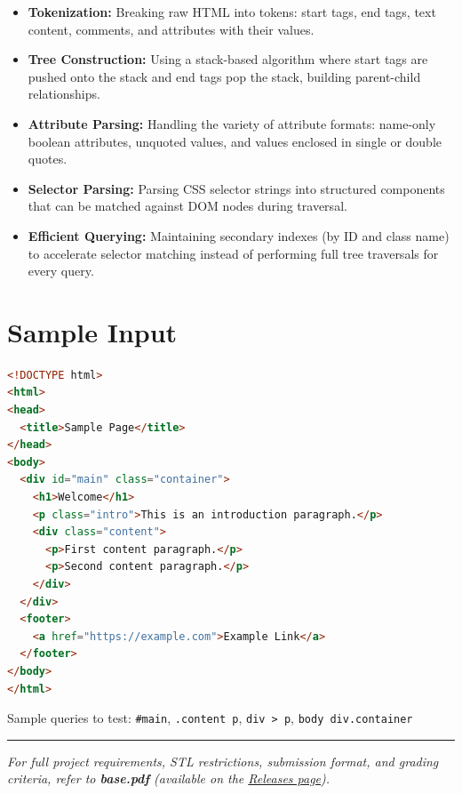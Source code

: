 \begin{itemize}
  \item \textbf{Tokenization:} Breaking raw HTML into tokens: start tags, end tags, text content, comments, and attributes with their values.
  \item \textbf{Tree Construction:} Using a stack-based algorithm where start tags are pushed onto the stack and end tags pop the stack, building parent-child relationships.
  \item \textbf{Attribute Parsing:} Handling the variety of attribute formats: name-only boolean attributes, unquoted values, and values enclosed in single or double quotes.
  \item \textbf{Selector Parsing:} Parsing CSS selector strings into structured components that can be matched against DOM nodes during traversal.
  \item \textbf{Efficient Querying:} Maintaining secondary indexes (by ID and class name) to accelerate selector matching instead of performing full tree traversals for every query.
\end{itemize}

\section{Sample Input}

\begin{lstlisting}[language=HTML, caption={data/input\_sample.html}]
<!DOCTYPE html>
<html>
<head>
  <title>Sample Page</title>
</head>
<body>
  <div id="main" class="container">
    <h1>Welcome</h1>
    <p class="intro">This is an introduction paragraph.</p>
    <div class="content">
      <p>First content paragraph.</p>
      <p>Second content paragraph.</p>
    </div>
  </div>
  <footer>
    <a href="https://example.com">Example Link</a>
  </footer>
</body>
</html>
\end{lstlisting}

Sample queries to test: \texttt{\#main}, \texttt{.content p}, \texttt{div > p}, \texttt{body div.container}

\vfill
\noindent\rule{\textwidth}{0.4pt}
{\small\textit{For full project requirements, STL restrictions, submission format, and grading criteria, refer to \textbf{base.pdf} (available on the \href{https://github.com/BestSithInEU/cse211-term-projects/releases}{Releases page}).}}
